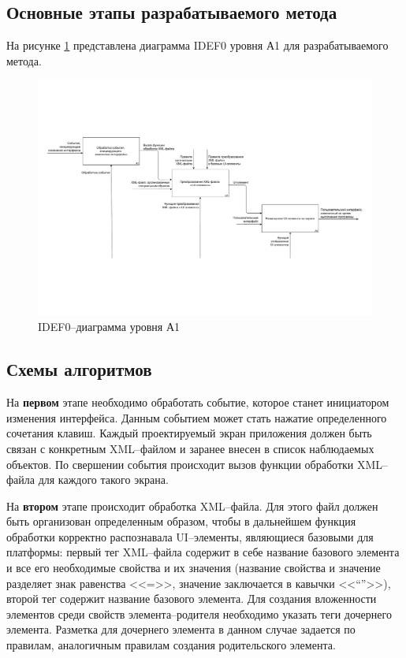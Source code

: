 \subsection{Основные этапы разрабатываемого метода}
На рисунке \ref{fig:a1} представлена диаграмма IDEF0 уровня А1 для разрабатываемого метода.

\begin{figure}[!htb]
	\centering
	\includegraphics[scale=0.4]{img/A1.pdf}
	\caption{IDEF0--диаграмма уровня А1}
	\label{fig:a1}
\end{figure}

\subsection{Схемы алгоритмов}

На \textbf{первом} этапе необходимо обработать событие, которое станет инициатором изменения интерфейса.
Данным событием может стать нажатие определенного сочетания клавиш.
Каждый проектируемый экран приложения должен быть связан с конкретным XML--файлом и заранее внесен в список наблюдаемых объектов. 
По свершении события происходит вызов функции обработки XML--файла для каждого такого экрана.


На \textbf{втором} этапе происходит обработка XML--файла. 
Для этого файл должен быть организован определенным образом, чтобы в дальнейшем функция обработки корректно распознавала UI--элементы, являющиеся базовыми для платформы: первый тег XML--файла содержит в себе название базового элемента и все его необходимые свойства и их значения (название свойства и значение разделяет знак равенства <<=>>, значение заключается в кавычки <<``''>>), второй тег содержит название базового элемента.
Для создания вложенности элементов среди свойств элемента--родителя необходимо указать теги дочернего элемента.
Разметка для дочернего элемента в данном случае задается по правилам, аналогичным правилам создания родительского элемента.

